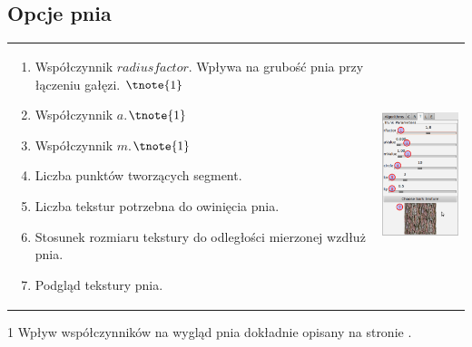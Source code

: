 \subsection{Opcje pnia}
\begin{threeparttable}
\begin{tabular}{lr}
\parbox[c]{95mm}{
\begin{enumerate}
	\item {Współczynnik $radius factor$. Wpływa na grubość pnia przy łączeniu gałęzi. $\tnote{1}$}
	\item {Współczynnik $a$.$\tnote{1}$}
	\item {Współczynnik $m$.$\tnote{1}$}
	\item {Liczba punktów tworzących segment.}
	\item {Liczba tekstur potrzebna do owinięcia pnia.}
	\item {Stosunek rozmiaru tekstury do odległości mierzonej wzdłuż pnia.}
	\item {Podgląd tekstury pnia.}
\end{enumerate}
} &
\parbox[c]{35mm}{
\includegraphics[width=35mm]{images/gui/trunk_panel.png}
}\\
\end{tabular}
\begin{tablenotes}
	\item[1] Wpływ współczynników na wygląd pnia dokładnie opisany na stronie \pageref{subsec:node_model}.
\end{tablenotes}

\end{threeparttable}

